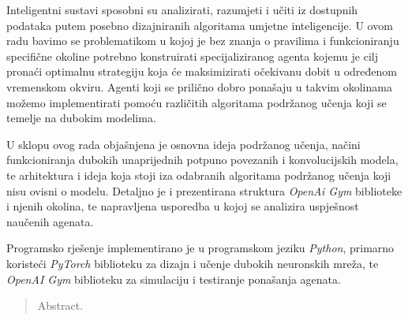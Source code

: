 \begin{sazetak}

Inteligentni sustavi sposobni su analizirati, razumjeti i učiti iz dostupnih podataka putem posebno dizajniranih algoritama umjetne inteligencije. U ovom radu bavimo se problematikom u kojoj je bez znanja o pravilima i funkcioniranju specifične okoline potrebno konstruirati specijaliziranog agenta kojemu je cilj pronaći optimalnu strategiju koja će maksimizirati očekivanu dobit u određenom vremenskom okviru. Agenti koji se prilično dobro ponašaju u takvim okolinama možemo implementirati pomoću različitih algoritama podržanog učenja koji se temelje na dubokim modelima. 

U sklopu ovog rada objašnjena je osnovna ideja podržanog učenja, načini funkcioniranja dubokih unaprijednih potpuno povezanih i konvolucijskih modela, te arhitektura i ideja koja stoji iza odabranih algoritama podržanog učenja koji nisu ovisni o modelu. Detaljno je i prezentirana struktura \textit{OpenAi Gym} biblioteke i njenih okolina, te napravljena usporedba u kojoj se analizira uspješnost naučenih agenata.

Programsko rješenje implementirano je u programskom jeziku \textit{Python}, primarno koristeći \textit{PyTorch} biblioteku za dizajn i učenje dubokih neuronskih mreža, te \textit{OpenAI Gym} biblioteku za simulaciju i testiranje ponašanja agenata.


\end{sazetak}

\begin{abstract}
Abstract.

\end{abstract}
